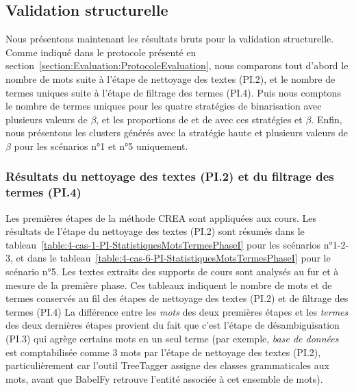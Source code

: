 \vfill
\hspace{0pt}




\clearpage %
\newpage   %


\subsection{Validation structurelle}
\label{subsection:Evaluation:DeroulementExperimentations:ValidationStructurelle}


Nous présentons maintenant les résultats bruts pour la validation structurelle.
Comme indiqué dans le protocole présenté en section~\ref{section:Evaluation:ProtocoleEvaluation}, nous comparons tout d'abord le nombre de mots suite à l'étape de nettoyage des textes (PI.2), et le nombre de termes uniques suite à l'étape de filtrage des termes (PI.4).
Puis nous comptons le nombre de termes uniques pour les quatre stratégies de binarisation avec plusieurs valeurs de $ \beta $, et les proportions de  \fg et de  \fg avec ces stratégies et $ \beta $.
Enfin, nous présentons les clusters générés avec la stratégie haute et plusieurs valeurs de $ \beta $ pour les scénarios n°1 et n°5 uniquement.


\bigskip

\subsubsection{Résultats du nettoyage des textes (PI.2) et du filtrage des termes (PI.4)}
\label{subsubsection:Evaluation:DeroulementExperimentations:ValidationStructurelle:ResultatsNettoyageTextesFiltrageTermes}

Les premières étapes de la méthode CREA sont appliquées aux cours.
Les résultats de l'étape du nettoyage des textes (PI.2) sont résumés dans le tableau~\ref{table:4-cas-1-PI-StatistiquesMotsTermesPhaseI} pour les scénarios n°1-2-3, et dans le tableau~\ref{table:4-cas-6-PI-StatistiquesMotsTermesPhaseI} pour le scénario n°5.
Les textes extraits des supports de cours sont analysés au fur et à mesure de la première phase.
Ces tableaux indiquent le nombre de mots et de termes conservés au fil des étapes de nettoyage des textes (PI.2) et de filtrage des termes (PI.4)
La différence entre les \textit{mots} des deux premières étapes et les \textit{termes} des deux dernières étapes provient du fait que c'est l'étape de désambiguïsation (PI.3) qui agrège certains mots en un seul terme (par exemple, \og \textit{base de données} \fg est comptabilisée comme 3 mots par l'étape de nettoyage des textes (PI.2), particulièrement car l'outil TreeTagger assigne des classes grammaticales aux mots, avant que BabelFy retrouve l'entité associée à cet ensemble de mots).

